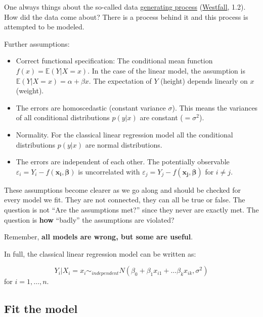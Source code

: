 \documentclass[
]{book}
\begin{document}
One always things about the so-called data
\href{https://en.wikipedia.org/wiki/Data_generating_process}{generating process}
(\href{https://www.routledge.com/Understanding-Regression-Analysis-A-Conditional-Distribution-Approach/Westfall-Arias/p/book/9780367493516?srsltid=AfmBOore3O_Ciecl0TTkr9AjPIY1d6OmbQa7o7IAdKpTSkD8s9HkwzD4}{Westfall}, 1.2).
How did the data come about? There is a process behind it and this process
is attempted to be modeled.

Further assumptions:

\begin{itemize}
\item
  Correct functional specification: The conditional mean function \(f(x) = \mathbb{E}(Y|X=x)\).
  In the case of the linear model, the assumption is \(\mathbb{E}(Y|X=x) = \alpha + \beta x\).
  The expectation of \(Y\) (height) depends linearly on \(x\) (weight).
\item
  The errors are homoscedastic (constant variance \(\sigma\)). This means the
  variances of all conditional distributions \(p(y|x)\) are constant (\(=\sigma^2\)).
\item
  Normality. For the classical linear regression model all the conditional
  distributions \(p(y|x)\) are normal distributions.
\item
  The errors are independent of each other.
  The potentially observable \(\varepsilon_i = Y_i - f(\mathbf{x_i}, \mathbf{\beta})\)
  is uncorrelated with \(\varepsilon_j = Y_j - f(\mathbf{x_j}, \mathbf{\beta})\) for
  \(i \neq j\).
\end{itemize}

These assumptions become clearer as we go along and should be checked
for every model we fit. They are not connected, they can all be true or false.
The question is not ``Are the assumptions met?'' since they never are exactly met.
The question is \textbf{how} ``badly'' the assumptions are violated?

Remember, \textbf{all models are wrong, but some are useful}.

In full, the classical linear regression model can be written as:

\[ Y_i|X_i = x_i \sim_{independent} N(\beta_0 + \beta_1 x_{i1} + \dots \beta_k x_{ik},\sigma^2)\]
for \(i = 1, \dots, n\).

\subsection{Fit the model}\label{fit-the-model}
\end{document}
